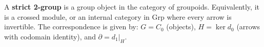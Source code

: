 A \textbf{strict 2-group} is a group object in the category of groupoids. Equivalently, it is a crossed module, or an internal category in Grp where every arrow is invertible. The correspondence is given by: $G = C_0$ (objects), $H = \ker d_0$ (arrows with codomain identity), and $\partial = d_1|_{H}$.